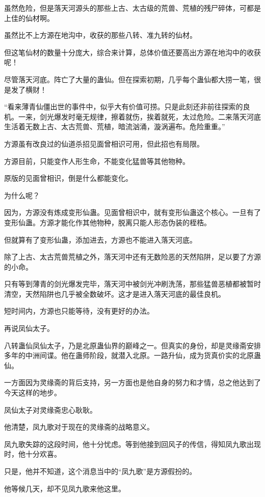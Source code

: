 \begin{this_body}
虽然危险，但是落天河源头的那些上古、太古级的荒兽、荒植的残尸碎体，可都是上佳的仙材啊。

虽然比不上方源在地沟中，收获的那些八转、准九转的仙材。

但这笔仙材的数量十分庞大，综合来计算，总体价值还要高出方源在地沟中的收获呢！

尽管落天河底。阵亡了大量的蛊仙。但在探索初期，几乎每个蛊仙都大捞一笔，很是发了横财！

“看来薄青仙僵出世的事件中，似乎大有价值可捞。只是此刻还非前往探索的良机。一来，剑光爆发时毫无规律，擦着就伤，挨着就死，太过危险。二来落天河底生活着无数上古、太古荒兽、荒植，暗流汹涌，漩涡遍布。危险重重。”

方源虽有改良过的仙道杀招见面曾相识可用，但此招也有局限。

方源目前，只能变作人形生命，不能变化猛兽等其他物种。

原版的见面曾相识，倒是什么都能变化。

为什么呢？

因为，方源没有炼成变形仙蛊。见面曾相识中，就有变形仙蛊这个核心。一旦有了变形仙蛊。方源才能化作其他物种，脱离只能人形态伪装的桎梏。

但就算有了变形仙蛊，添加进去，方源也不能进入落天河底。

除了上古、太古荒兽荒植之外，落天河中还有无数险恶的天然陷阱，足以要了方源的小命。

只有等到薄青的剑光爆发完毕，落天河中被剑光冲刷洗荡，那些猛兽恶植都被暂时清空，天然陷阱也几乎被全数破坏。这才是进入落天河底的最佳良机。

短时间内，方源也只能等待，没有更好的办法。

再说凤仙太子。

八转蛊仙凤仙太子，乃是北原蛊仙界的巅峰之一。但真实的身份，却是灵缘斋安排多年的中洲间谍。他在蛊师阶段，就潜入北原。一路升仙，成为货真价实的北原蛊仙。

一方面因为灵缘斋的背后支持，另一方面也是他自身的努力和才情，总之他达到了今天这样的地步。

凤仙太子对灵缘斋忠心耿耿。

他清楚，凤九歌对于现在的灵缘斋的战略意义。

凤九歌失踪的这段时间，他十分忧虑。等到他接到回风子的传信，得知凤九歌出现时，他十分欢喜。

只是，他并不知道，这个消息当中的“凤九歌”是方源假扮的。

他等候几天，却不见凤九歌来他这里。


\end{this_body}
